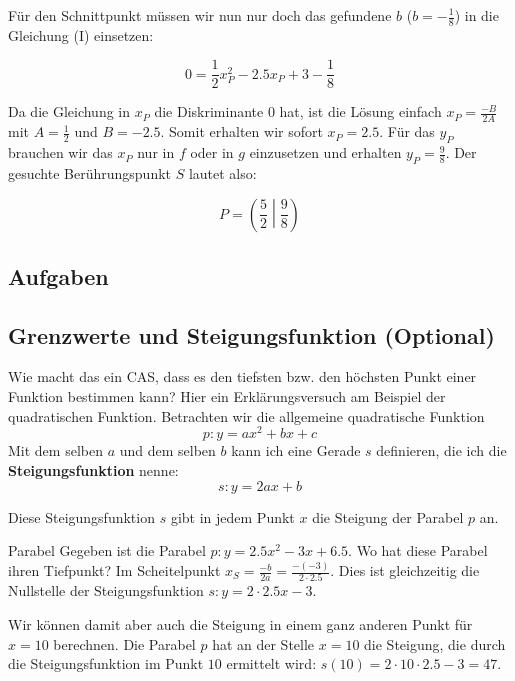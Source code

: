 Für den Schnittpunkt müssen wir nun nur doch das gefundene $b$ ($b =
-\frac{1}{8}$) in die Gleichung (I) einsetzen:

$$0 = \frac{1}{2}x_P^2 - 2.5x_P +3 - \frac{1}{8}$$

Da die Gleichung in $x_P$ die Diskriminante 0 hat, ist die Lösung
einfach $x_P = \frac{-B}{2A}$ mit $A = \frac{1}{2}$ und
$B=-2.5$. Somit erhalten wir sofort $x_P = 2.5$. Für das $y_P$
brauchen wir das $x_P$ nur in $f$ oder in $g$ einzusetzen und
erhalten $y_P =\frac{9}{8}$. Der gesuchte Berührungspunkt $S$ lautet
also:

$$P = \left(\frac{5}{2}\middle|\frac{9}{8}\right)$$


\subsection{Aufgaben}
\newpage


\subsection{Grenzwerte und Steigungsfunktion (Optional)}

Wie macht das ein CAS, dass es den tiefsten bzw. den höchsten Punkt
einer Funktion bestimmen kann? Hier ein Erklärungsversuch am Beispiel
der quadratischen Funktion.
Betrachten wir die allgemeine quadratische Funktion $$p: y=ax^2 + bx +
c$$
Mit dem selben $a$ und dem selben $b$ kann ich eine Gerade $s$
definieren, die ich die \textbf{Steigungsfunktion} nenne:
$$s: y= 2ax+b$$

Diese Steigungsfunktion $s$ gibt in jedem Punkt $x$ die Steigung der
Parabel $p$ an.

\begin{beispiel}{Parabel}{}
  Gegeben ist die Parabel $p: y=2.5x^2 - 3x + 6.5$. Wo hat diese Parabel
  ihren Tiefpunkt? Im Scheitelpunkt $x_S =
  \frac{-b}{2a} = \frac{-(-3)}{2\cdot{}2.5}$. Dies ist gleichzeitig die Nullstelle der
  Steigungsfunktion $s: y= 2\cdot{}2.5x - 3$.

  Wir können damit aber auch die Steigung in einem ganz anderen Punkt
  \zB für $x=10$ berechnen. Die Parabel $p$ hat an der Stelle $x=10$
  die Steigung, die durch die Steigungsfunktion im Punkt $10$
  ermittelt wird: $s(10) = 2\cdot{}10\cdot{2.5} - 3 = 47$.
  
\end{beispiel}

